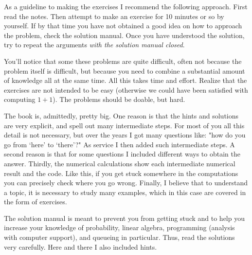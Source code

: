 As a guideline to making the exercises I recommend the following approach.
First read the notes.
Then attempt to make an exercise for 10 minutes or so by yourself.
If by that time you have not obtained a good idea on how to approach the problem, check the solution manual.
Once you have understood the solution, try to repeat the arguments \emph{with the solution manual closed}.

You'll notice that some these problems are quite difficult, often not because the problem itself is difficult, but because you need to combine a substantial amount of knowledge all at the same time.
All this takes time and effort.
Realize that the exercises are not intended to be easy (otherwise we could have been satisfied with computing $1+1$).
The problems should be doable, but hard.

The book is, admittedly, pretty big.
One reason is that the hints and solutions are very explicit, and spell out many intermediate steps.
For most of you all this detail is not necessary, but over the years I got many questions like: "how do you go from `here' to `there'?"
As service I then added such intermediate steps.
A second reason is that for some questions I included different ways to obtain the answer.
Thirdly, the numerical calculations show each intermediate numerical result and the code.
Like this, if you get stuck somewhere in the computations you can precisely check where you go wrong.
Finally, I believe that to understand a topic, it is necessary to study many examples, which in this case are covered in the form of exercises.

The solution manual is meant to prevent you from getting stuck and to help you increase your knowledge of probability, linear algebra, programming (analysis with computer support), and queueing in particular.
Thus, read the solutions very carefully.
Here and there I also included hints.






